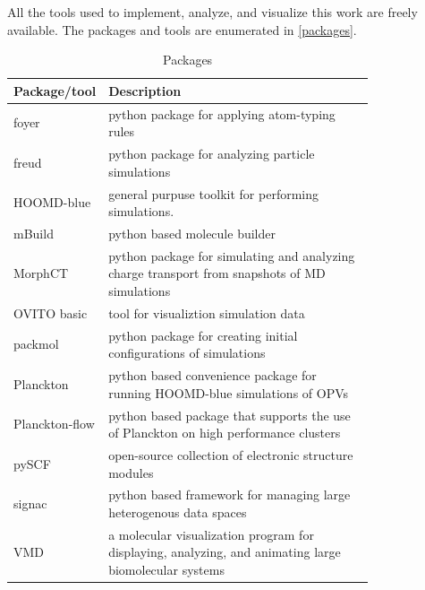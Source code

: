 All the tools used to implement, analyze, and
visualize this work are freely available. 
The packages and tools are enumerated in \autoref{packages}.
\begin{table}[ht]
    \caption{Packages} %
\centering %
\begin{tabular}{|l|p{0.8\linewidth}|} %
\hline\hline %
Package/tool & Description \\ [0.5ex] %
\hline %
    foyer & python package for applying atom-typing rules  \cite{Klein2018a}\\ [1ex] %
freud & python package for analyzing particle simulations  \cite{Ramasubramani2020}\\ [1ex] %
HOOMD-blue & general purpuse toolkit for performing simulations.   \cite{Anderson2020a}\\ [1ex] %
    mBuild & python based molecule builder \cite{Klein2018a}\\ [1ex] %
MorphCT & python package for simulating and analyzing charge transport from 
    snapshots of MD simulations \cite{jones2017}\cite{cmelab}\\[1ex] 
OVITO basic & tool for visualiztion simulation data \cite{Stukowski2010a}\\[1ex] 
packmol & python package for creating initial configurations of simulations \cite{Martinez2009}\\[1ex] 
Planckton & python based convenience package for running HOOMD-blue
    simulations of OPVs \cite{cmelab}\\[1ex]
Planckton-flow & python based package that supports the use of Planckton on
    high performance clusters\cite{cmelab}\\[1ex]
pySCF & open-source collection of electronic structure modules \cite{Sun2018a}\\[1ex]
signac & python based framework for managing large heterogenous data spaces \cite{Adorf2016}\\[1ex]
VMD & a molecular visualization program for displaying, analyzing, and animating large biomolecular
    systems \cite{Humphrey1996}\\


\hline %
\end{tabular}
\label{packages} %
\end{table}

